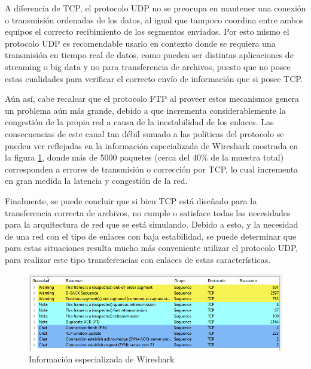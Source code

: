 \documentclass[10pt]{article}
\begin{document}
\begin{tcolorbox}[enhanced,frame style image=blueshade.png,
  opacityback=0.75,opacitybacktitle=0.25,
  colback=blue!5!white,colframe=blue!75!black,
  title=¿Sería conveniente usar un enlace UDP para la transferencia de archivos en este tipo de enlace?]
  
  A diferencia de TCP, el protocolo UDP no se preocupa en mantener una conexión o transmisión ordenadas de los datos, al igual que tampoco coordina entre ambos equipos el correcto recibimiento de los segmentos enviados. Por esto mismo el protocolo UDP es recomendable usarlo en contexto donde se requiera una transmisión en tiempo real de datos, como pueden ser distintas aplicaciones de streaming o big data y no para transferencia de archivos, puesto que no posee estas cualidades para verificar el correcto envío de información que si posee TCP. \newline 
  
  \noindent
  Aún así, cabe recalcar que el protocolo FTP al proveer estos mecanismos genera un problema aún más grande, debido a que incrementa considerablemente la congestión de la propia red a causa de la inestabilidad de los enlaces. Las consecuencias de este canal tan débil sumado a las políticas del protocolo se pueden ver reflejadas en la información especializada de Wireshark mostrada en la figura \ref{fig:item04_download_wireshark_info}, donde más de 5000 paquetes (cerca del 40\% de la muestra total) corresponden a errores de transmisión o corrección por TCP, lo cual incrementa en gran medida la latencia y congestión de la red.\newline
  
  \noindent
  Finalmente, se puede concluir que si bien TCP está diseñado para la transferencia correcta de archivos, no cumple o satisface todas las necesidades para la arquitectura de red que se está simulando. Debido a esto, y la necesidad de una red con el tipo de enlaces con baja estabilidad, se puede determinar que para estas situaciones resulta mucho más conveniente utilizar el protocolo UDP, para realizar este tipo transferencias con enlaces de estas características.
  

\begin{figure}[H]
    \centering
    \includegraphics[width=\linewidth]{Imagenes/ftp_info.png}
    \caption{Información especializada de Wireshark}
    \label{fig:item04_download_wireshark_info}
\end{figure}

\end{tcolorbox}
\end{document}
